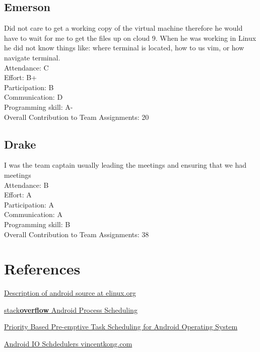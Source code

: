 \documentclass[letterpaper,10pt]{article}
\begin{document}
\subsection{Emerson}
Did not care to get a working copy of the virtual machine therefore he would have to wait for me to get the files up on cloud 9. When he was working in Linux he did not know things like: where terminal is located, how to us vim, or how navigate terminal.\\
Attendance: C\\
Effort: B+\\
Participation: B\\
Communication: D\\
Programming skill: A-\\
Overall Contribution to Team Assignments: 20
\subsection{Drake}
I was the team captain usually leading the meetings and ensuring that we had meetings\\
Attendance: B\\
Effort: A\\
Participation: A\\
Communication: A\\
Programming skill: B\\
Overall Contribution to Team Assignments: 38

\newpage

\section{References}

\href{http://elinux.org/Master-android}{Description of android source at elinux.org}

\href{http://stackoverflow.com/questions/7931032/android-process-scheduling}{stack\textbf{overflow} Android Process Scheduling} 

\href{http://arxiv.org/ftp/arxiv/papers/1304/1304.7889.pdf}{Priority Based Pre-emptive Task Scheduling for Android Operating System}

\href{https://www.vincentkong.com/wiki/android/android-io-schedulers/}{Android IO Schdedulers vincentkong.com}
\end{document}
